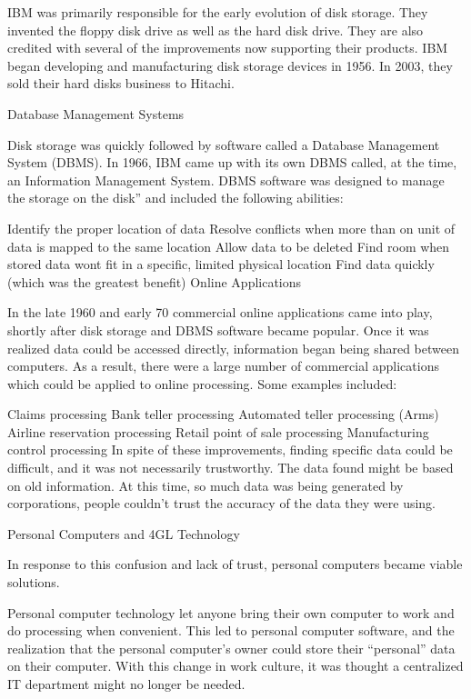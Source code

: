 \documentclass{article}
\begin{document}
IBM was primarily responsible for the early evolution of disk storage. They invented the floppy disk drive as well as the hard disk drive. They are also credited with several of the improvements now supporting their products. IBM began developing and manufacturing disk storage devices in 1956. In 2003, they sold their hard disks business to Hitachi.

Database Management Systems

Disk storage was quickly followed by software called a Database Management System (DBMS). In 1966, IBM came up with its own DBMS called, at the time, an Information Management System. DBMS software was designed to manage the storage on the disk” and included the following abilities:

Identify the proper location of data
Resolve conflicts when more than on unit of data is mapped to the same location
Allow data to be deleted
Find room when stored data wont fit in a specific, limited physical location
Find data quickly (which was the greatest benefit)
Online Applications

In the late 1960 and early 70 commercial online applications came into play, shortly after disk storage and DBMS software became popular. Once it was realized data could be accessed directly, information began being shared between computers. As a result, there were a large number of commercial applications which could be applied to online processing. Some examples included:

Claims processing
Bank teller processing
Automated teller processing (Arms)
Airline reservation processing
Retail point of sale processing
Manufacturing control processing
In spite of these improvements, finding specific data could be difficult, and it was not necessarily trustworthy. The data found might be based on old information. At this time, so much data was being generated by corporations, people couldn't trust the accuracy of the data they were using.

Personal Computers and 4GL Technology

In response to this confusion and lack of trust, personal computers became viable solutions.

Personal computer technology let anyone bring their own computer to work and do processing when convenient. This led to personal computer software, and the realization that the personal computer's owner could store their “personal” data on their computer. With this change in work culture, it was thought a centralized IT department might no longer be needed.
\end{document}
